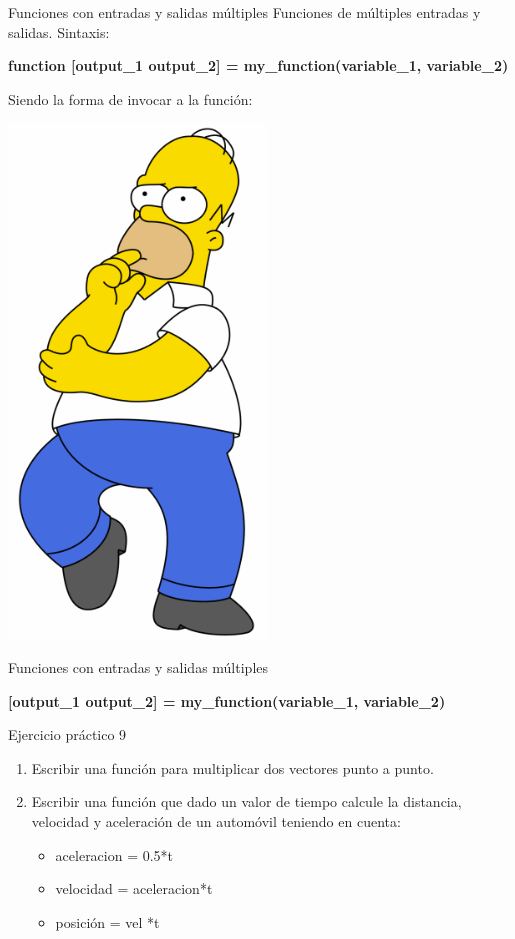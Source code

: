 \documentclass{bredelebeamer}
\begin{document}
\begin{frame}{Funciones con entradas y salidas múltiples}
Funciones de múltiples entradas y salidas. Sintaxis:\\
\begin{center}
\textbf{function [output\_1 output\_2] = my\_function(variable\_1, variable\_2)}
\end{center}
Siendo la forma de invocar a la función:
\begin{center}
\includegraphics[scale=0.15]{images/img40.png}
\end{center}
\end{frame}

\begin{frame}{Funciones con entradas y salidas múltiples}
\begin{center}
\textbf{[output\_1 output\_2] = my\_function(variable\_1, variable\_2)}
\end{center}
\end{frame}

\begin{frame}{Ejercicio práctico 9}
\begin{enumerate}
\item Escribir una función para multiplicar dos vectores punto a punto.
\item Escribir una función que dado un valor de tiempo calcule la distancia, velocidad y aceleración de un automóvil teniendo en cuenta:
\begin{itemize}
\item aceleracion = 0.5*t
\item velocidad = aceleracion*t
\item posición = vel *t
\end{itemize}
\end{enumerate}
\end{frame}
\end{document}
